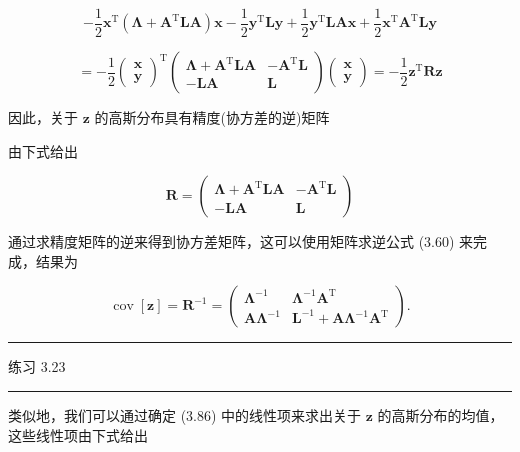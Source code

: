 \documentclass[10pt]{article}
\newcommand{\HRule}{\begin{center}\rule{0.9\linewidth}{0.2mm}\end{center}}
\begin{document}
\[
- \frac{1}{2}{\mathbf{x}}^{\mathrm{T}}\left( {\mathbf{\Lambda } + {\mathbf{A}}^{\mathrm{T}}\mathbf{{LA}}}\right) \mathbf{x} - \frac{1}{2}{\mathbf{y}}^{\mathrm{T}}\mathbf{{Ly}} + \frac{1}{2}{\mathbf{y}}^{\mathrm{T}}\mathbf{{LA}}\mathbf{x} + \frac{1}{2}{\mathbf{x}}^{\mathrm{T}}{\mathbf{A}}^{\mathrm{T}}\mathbf{{Ly}}
\]

\[
=  - \frac{1}{2}{\left( \begin{array}{l} \mathbf{x} \\  \mathbf{y} \end{array}\right) }^{\mathrm{T}}\left( \begin{matrix} \mathbf{\Lambda } + {\mathbf{A}}^{\mathrm{T}}\mathbf{{LA}} &  - {\mathbf{A}}^{\mathrm{T}}\mathbf{L} \\   - \mathbf{{LA}} & \mathbf{L} \end{matrix}\right) \left( \begin{array}{l} \mathbf{x} \\  \mathbf{y} \end{array}\right)  =  - \frac{1}{2}{\mathbf{z}}^{\mathrm{T}}\mathbf{R}\mathbf{z} \tag{3.87}
\]

因此，关于 \(\mathbf{z}\) 的高斯分布具有精度(协方差的逆)矩阵

由下式给出

\[
\mathbf{R} = \left( \begin{matrix} \mathbf{\Lambda } + {\mathbf{A}}^{\mathrm{T}}\mathbf{{LA}} &  - {\mathbf{A}}^{\mathrm{T}}\mathbf{L} \\   - \mathbf{{LA}} & \mathbf{L} \end{matrix}\right)  \tag{3.88}
\]

通过求精度矩阵的逆来得到协方差矩阵，这可以使用矩阵求逆公式 (3.60) 来完成，结果为

\[
\operatorname{cov}\left\lbrack  \mathbf{z}\right\rbrack   = {\mathbf{R}}^{-1} = \left( \begin{matrix} {\mathbf{\Lambda }}^{-1} & {\mathbf{\Lambda }}^{-1}{\mathbf{A}}^{\mathrm{T}} \\  \mathbf{A}{\mathbf{\Lambda }}^{-1} & {\mathbf{L}}^{-1} + \mathbf{A}{\mathbf{\Lambda }}^{-1}{\mathbf{A}}^{\mathrm{T}} \end{matrix}\right) . \tag{3.89}
\]

\HRule

练习 3.23

\HRule

类似地，我们可以通过确定 (3.86) 中的线性项来求出关于 \(\mathbf{z}\) 的高斯分布的均值，这些线性项由下式给出
\end{document}
